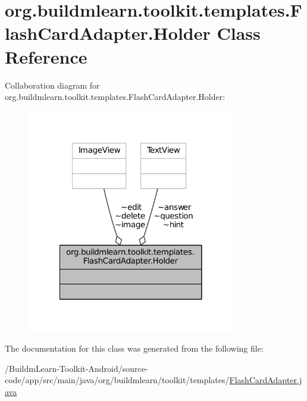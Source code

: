\hypertarget{classorg_1_1buildmlearn_1_1toolkit_1_1templates_1_1FlashCardAdapter_1_1Holder}{\section{org.\-buildmlearn.\-toolkit.\-templates.\-Flash\-Card\-Adapter.\-Holder Class Reference}
\label{classorg_1_1buildmlearn_1_1toolkit_1_1templates_1_1FlashCardAdapter_1_1Holder}
}


Collaboration diagram for org.\-buildmlearn.\-toolkit.\-templates.\-Flash\-Card\-Adapter.\-Holder\-:
\nopagebreak
\begin{figure}[H]
\begin{center}
\leavevmode
\includegraphics[width=258pt]{d1/d30/classorg_1_1buildmlearn_1_1toolkit_1_1templates_1_1FlashCardAdapter_1_1Holder__coll__graph}
\end{center}
\end{figure}


The documentation for this class was generated from the following file\-:\begin{DoxyCompactItemize}
\item 
/\-Buildm\-Learn-\/\-Toolkit-\/\-Android/source-\/code/app/src/main/java/org/buildmlearn/toolkit/templates/\hyperlink{FlashCardAdapter_8java}{Flash\-Card\-Adapter.\-java}\end{DoxyCompactItemize}
